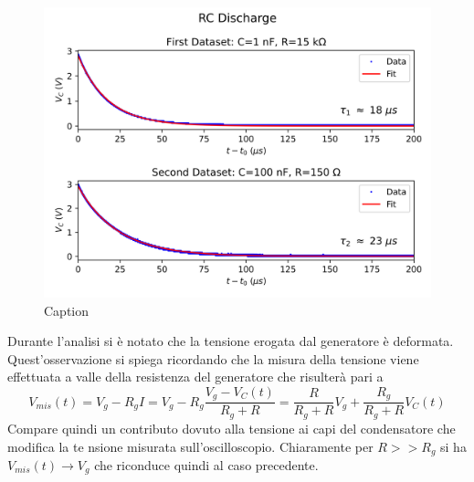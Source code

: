 \begin{figure}
    \centering
    \includegraphics[trim=0 0 0 177, clip, width=\textwidth]{Scarica_RC.png}
    \caption{Caption}
    \label{fig:enter-label}
\end{figure}
Durante l'analisi si è notato che la tensione erogata dal generatore è deformata. Quest'osservazione si spiega ricordando che la misura della tensione viene effettuata a valle della resistenza del generatore che risulterà pari a 
\begin{equation}
    V_{mis}(t)=V_g-R_g I=V_g-R_g\frac{V_g-V_C(t)}{R_g+R}=\frac{R}{R_g+R}V_g+\frac{R_g}{R_g+R}V_C(t)
\end{equation}
Compare quindi un contributo dovuto alla tensione ai capi del condensatore che modifica la te nsione misurata sull'oscilloscopio. Chiaramente per $R>>R_g$ si ha $V_{mis}(t)\xrightarrow{}V_g$ che riconduce quindi al caso precedente. 
